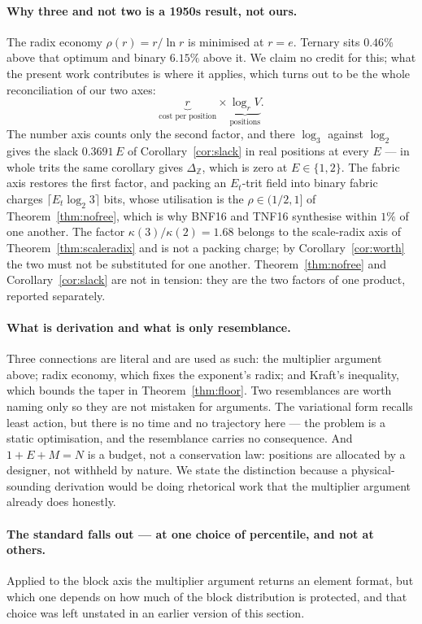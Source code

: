 \documentclass[11pt]{article}
\theoremstyle{definition}
\begin{document}
\paragraph{Why three and not two is a 1950s result, not ours.} The radix economy
$\rho(r) = r/\ln r$ is minimised at $r = e$. Ternary sits $0.46\%$ above that
optimum and binary $6.15\%$ above it. We claim no credit for this; what the present
work contributes is where it applies, which turns out to be the whole
reconciliation of our two axes:
\[
  \underbrace{r}_{\text{cost per position}} \times \underbrace{\log_r V}_{\text{positions}} .
\]
The number axis counts only the second factor, and there $\log_3$ against $\log_2$
gives the slack $0.3691\,E$ of Corollary~\ref{cor:slack} in real positions at every
$E$ --- in whole trits the same corollary gives $\Delta_{\mathbb{Z}}$, which is
zero at $E \in \{1,2\}$. The fabric axis restores the first factor, and packing an
$E_t$-trit field into binary fabric charges $\lceil E_t\log_2 3\rceil$ bits, whose
utilisation is the $\rho \in (1/2,1]$ of Theorem~\ref{thm:nofree}, which is why
BNF16 and TNF16 synthesise within $1\%$ of one another. The factor
$\kappa(3)/\kappa(2) = 1.68$ belongs to the scale-radix axis of
Theorem~\ref{thm:scaleradix} and is not a packing charge; by
Corollary~\ref{cor:worth} the two must not be substituted for one another. Theorem~\ref{thm:nofree} and
Corollary~\ref{cor:slack} are not in tension: they are the two factors of one
product, reported separately.

\paragraph{What is derivation and what is only resemblance.} Three connections are
literal and are used as such: the multiplier argument above; radix economy, which
fixes the exponent's radix; and Kraft's inequality, which bounds the taper in
Theorem~\ref{thm:floor}. Two resemblances are worth naming only so they are not
mistaken for arguments. The variational form recalls least action, but there is no
time and no trajectory here --- the problem is a static optimisation, and the
resemblance carries no consequence. And $1+E+M=N$ is a budget, not a conservation
law: positions are allocated by a designer, not withheld by nature. We state the
distinction because a physical-sounding derivation would be doing rhetorical work
that the multiplier argument already does honestly.

\paragraph{The standard falls out --- at one choice of percentile, and not at
others.} Applied to the block axis the multiplier argument returns an element
format, but which one depends on how much of the block distribution is protected,
and that choice was left unstated in an earlier version of this section.
\end{document}
